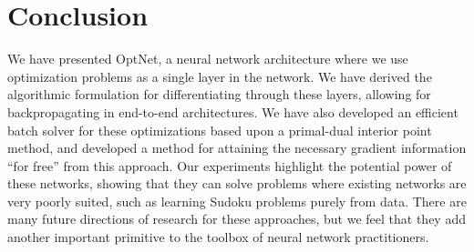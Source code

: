 \section{Conclusion}
We have presented OptNet, a neural network architecture where we use
optimization problems as a single layer in the network.  We have derived the
algorithmic formulation for differentiating through these layers, allowing for
backpropagating in end-to-end architectures.  We have also developed an
efficient batch solver for these optimizations based upon a primal-dual interior
point method, and developed a method for attaining the necessary gradient
information ``for free'' from this approach.  Our experiments highlight the
potential power of these networks, showing that they can solve problems where
existing networks are very poorly suited, such as learning Sudoku problems
purely from data.  There are many future directions of research for these
approaches, but we feel that they add another important primitive to the toolbox
of neural network practitioners.

